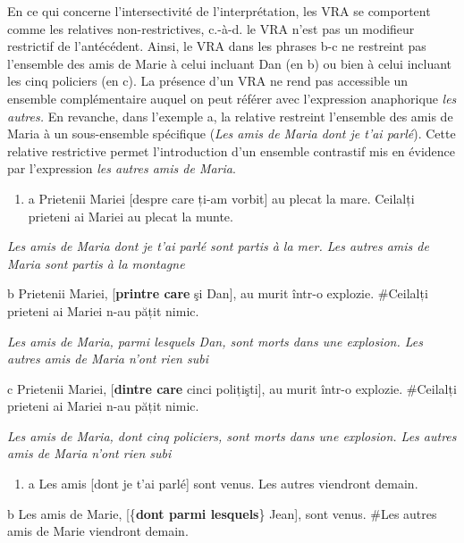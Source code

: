 En ce qui concerne l'intersectivité de l'interprétation, les VRA se comportent comme les relatives non-restrictives, c.-à-d. le VRA n'est pas un modifieur restrictif de l'antécédent. Ainsi, le VRA dans les phrases b-c ne restreint pas l'ensemble des amis de Marie à celui incluant Dan (en b) ou bien à celui incluant les cinq policiers (en c). La présence d'un VRA ne rend pas accessible un ensemble complémentaire auquel on peut référer avec l'expression anaphorique \textit{les autres.} En revanche, dans l'exemple a, la relative restreint l'ensemble des amis de Maria à un sous-ensemble spécifique (\textit{Les amis de Maria dont je t'ai parlé}). Cette relative restrictive permet l'introduction d'un ensemble contrastif mis en évidence par l'expression \textit{les autres amis de Maria}. 


\begin{enumerate}
\item \label{bkm:Ref293947017}a  Prietenii Mariei [despre care ți-am vorbit] au plecat la mare. Ceilalți prieteni ai Mariei au plecat la munte.  


\end{enumerate}
{\itshape
Les amis de Maria dont je t'ai parlé sont partis à la mer. Les autres amis de Maria sont partis à la montagne}

  b  Prietenii Mariei, [\textbf{printre care} şi Dan], au murit într-o explozie. \#Ceilalți prieteni ai Mariei n-au pățit nimic.

{\itshape
Les amis de Maria, parmi lesquels Dan, sont morts dans une explosion. Les autres amis de Maria n'ont rien subi}

  c  Prietenii Mariei, [\textbf{dintre care} cinci polițişti], au murit într-o explozie. \#Ceilalți prieteni ai Mariei n-au pățit nimic.

{\itshape
Les amis de Maria, dont cinq policiers, sont morts dans une explosion. Les autres amis de Maria n'ont rien subi}


\begin{enumerate}
\item a  Les amis [dont je t'ai parlé] sont venus. Les autres viendront demain. 


\end{enumerate}
  b  Les amis de Marie, [\{\textbf{dont {\textbar} parmi lesquels}\}\textbf{} Jean], sont venus. \#Les autres amis de Marie viendront demain. 

